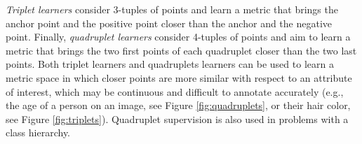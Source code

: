 \documentclass[twoside,11pt]{article}
\begin{document}
\emph{Triplet learners} consider 3-tuples of points and learn a metric that brings the anchor point and the positive point closer than the anchor and the negative point.
Finally, \emph{quadruplet learners} consider 4-tuples of points and aim to learn a metric that brings the two first points of each quadruplet closer than the two last points.
Both triplet learners and quadruplets learners can be used to learn a metric space in which closer points are more similar with respect to an attribute of interest, which may be continuous and difficult to annotate accurately (e.g., the age of a person on an image, see Figure \ref{fig:quadruplets}, or their hair color, see Figure \ref{fig:triplets}).
Quadruplet supervision is also used in problems with a class hierarchy.


\end{document}
